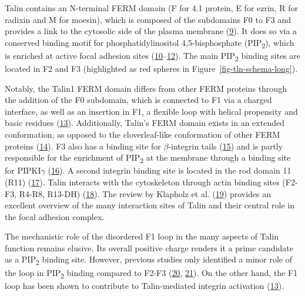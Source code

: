 \documentclass[
  twocolumn]{biophys-new-mod}
\begin{document}
Talin contains an N-terminal FERM domain (F for 4.1 protein, E for
ezrin, R for radixin and M for moesin), which is composed of the
subdomains F0 to F3 and provides a link to the cytosolic side of the
plasma membrane
(\protect\hyperlink{ref-chishtiFERMDomainUnique1998}{9}). It does so via
a conserved binding motif for phosphatidylinositol 4,5-bisphosphate
(PIP\textsubscript{2}), which is enriched at active focal adhesion sites
(\protect\hyperlink{ref-maniFERMDomainPhosphoinositide2011}{10}--\protect\hyperlink{ref-songNovelMembranedependentSwitch2012a}{12}).
The main PIP\textsubscript{2} binding sites are located in F2 and F3
(highlighted as red spheres in Figure~\ref{fig-tln-schema-long}).

Notably, the Talin1 FERM domain differs from other FERM proteins through
the addition of the F0 subdomain, which is connected to F1 via a charged
interface, as well as an insertion in F1, a flexible loop with helical
propensity and basic residues
(\protect\hyperlink{ref-goultStructureDoubleUbiquitinlike2010}{13}).
Additionally, Talin's FERM domain exists in an extended conformation, as
opposed to the cloverleaf-like conformation of other FERM proteins
(\protect\hyperlink{ref-elliottStructureTalinHead2010}{14}). F3 also has
a binding site for \(\beta\)-integrin tails
(\protect\hyperlink{ref-calderwoodTalinHeadDomain1999}{15}) and is
partly responsible for the enrichment of PIP\textsubscript{2} at the
membrane through a binding site for PIPKI\(\gamma\)
(\protect\hyperlink{ref-calderwoodTalinsKindlinsPartners2013}{16}). A
second integrin binding site is located in the rod domain 11 (R11)
(\protect\hyperlink{ref-horwitzInteractionPlasmaMembrane1986}{17}).
Talin interacts with the cytoskeleton through actin binding sites
(F2-F3, R4-R8, R13-DH)
(\protect\hyperlink{ref-mccannLWEQModuleConserved1997}{18}). The review
by Klapholz et al.
(\protect\hyperlink{ref-klapholzTalinMasterIntegrin2017}{19}) provides
an excellent overview of the many interaction sites of Talin and their
central role in the focal adhesion complex.

The mechanistic role of the disordered F1 loop in the many aspects of
Talin function remains elusive. Its overall positive charge renders it a
prime candidate as a PIP\textsubscript{2} binding site. However,
previous studies only identified a minor role of the loop in
PIP\textsubscript{2} binding compared to F2-F3
(\protect\hyperlink{ref-chinthalapudiInteractionTalinCell2018a}{20},
\protect\hyperlink{ref-saltelNewPIP22009}{21}). On the other hand, the
F1 loop has been shown to contribute to Talin-mediated integrin
activation
(\protect\hyperlink{ref-goultStructureDoubleUbiquitinlike2010}{13}).
\end{document}
